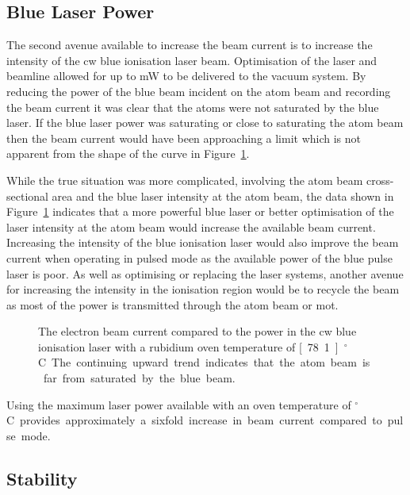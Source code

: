 \subsection{Blue Laser Power}

The second avenue available to increase the beam current is to increase the intensity of the \gls{cw} blue ionisation laser beam.
Optimisation of the laser and beamline allowed for up to \unit[280]{mW} to be delivered to the vacuum system.
By reducing the power of the blue beam incident on the atom beam and recording the beam current it was clear that the atoms were not saturated by the blue laser.
If the blue laser power was saturating or close to saturating the atom beam then the beam current would have been approaching a limit which is not apparent from the shape of the curve in Figure~\ref{figure:blue_power}.

While the true situation was more complicated, involving the atom beam cross-sectional area and the blue laser intensity at the atom beam, the data shown in Figure~\ref{figure:blue_power} indicates that a more powerful blue laser or better optimisation of the laser intensity at the atom beam would increase the available beam current.
Increasing the intensity of the blue ionisation laser would also improve the beam current when operating in pulsed mode as the available power of the blue pulse laser is poor.
As well as optimising or replacing the laser systems, another avenue for increasing the intensity in the ionisation region would be to recycle the beam as most of the power is transmitted through the atom beam or \gls{mot}.

\begin{figure}
    \center
    
    \caption[Beam current and ionisation laser power.]{The electron beam current compared to the power in the \gls{cw} blue ionisation laser with a rubidium oven temperature of \unit[78.1]{$^\circ$C}.
    The continuing upward trend indicates that the atom beam is far from saturated by the blue beam.}
    \label{figure:blue_power}
\end{figure}

Using the maximum laser power available with an oven temperature of \unit[200]{$^\circ$C} provides approximately a sixfold increase in beam current compared to pulse mode.

\subsection{Stability}\label{section:stability}

